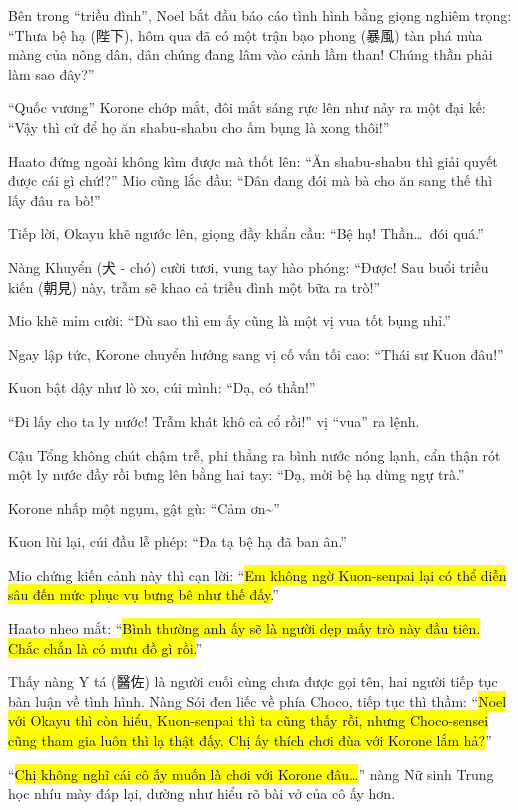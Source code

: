 \documentclass[../main.tex]{subfiles}
\begin{document}
Bên trong ``triều đình'', Noel bắt đầu báo cáo tình hình bằng giọng nghiêm trọng: ``Thưa bệ hạ (陛下), hôm qua đã có một trận bạo phong (暴風) tàn phá mùa màng của nông dân, dân chúng đang lâm vào cảnh lầm than! Chúng thần phải làm sao đây?''


``Quốc vương'' Korone chớp mắt, đôi mắt sáng rực lên như nảy ra một đại kế: ``Vậy thì cứ để họ ăn shabu-shabu cho ấm bụng là xong thôi!''

Haato đứng ngoài không kìm được mà thốt lên: ``Ăn shabu-shabu thì giải quyết được cái gì chứ!?'' Mio cũng lắc đầu: ``Dân đang đói mà bà cho ăn sang thế thì lấy đâu ra bò!''

Tiếp lời, Okayu khẽ ngước lên, giọng đầy khẩn cầu: ``Bệ hạ! Thần\dots\ đói quá.''

Nàng Khuyển (犬 - chó) cười tươi, vung tay hào phóng: ``Được! Sau buổi triều kiến (朝見) này, trẫm sẽ khao cả triều đình một bữa ra trò!''

Mio khẽ mỉm cười: ``Dù sao thì em ấy cũng là một vị vua tốt bụng nhỉ.''

Ngay lập tức, Korone chuyển hướng sang vị cố vấn tối cao: ``Thái sư Kuon đâu!''

Kuon bật dậy như lò xo, cúi mình: ``Dạ, có thần!''

``Đi lấy cho ta ly nước! Trẫm khát khô cả cổ rồi!'' vị ``vua'' ra lệnh.

Cậu Tổng không chút chậm trễ, phi thẳng ra bình nước nóng lạnh, cẩn thận rót một ly nước đầy rồi bưng lên bằng hai tay: ``Dạ, mời bệ hạ dùng ngự trà.''

Korone nhấp một ngụm, gật gù: ``Cảm ơn\~{}''

Kuon lùi lại, cúi đầu lễ phép: ``Đa tạ bệ hạ đã ban ân.''

Mio chứng kiến cảnh này thì cạn lời: ``\hl{Em không ngờ Kuon-senpai lại có thể diễn sâu đến mức phục vụ bưng bê như thế đấy.}''

Haato nheo mắt: ``\hl{Bình thường anh ấy sẽ là người dẹp mấy trò này đầu tiên. Chắc chắn là có mưu đồ gì rồi.}''


Thấy nàng Y tá (醫佐) là người cuối cùng chưa được gọi tên, hai người tiếp tục bàn luận về tình hình. Nàng Sói đen liếc về phía Choco, tiếp tục thì thầm: ``\hl{Noel với Okayu thì còn hiểu, Kuon-senpai thì ta cũng thấy rồi, nhưng Choco-sensei cũng tham gia luôn thì lạ thật đấy. Chị ấy thích chơi đùa với Korone lắm hả?}''

``{\hl{Chị không nghĩ cái cô ấy muốn là chơi với Korone đâu\dots}}'' nàng Nữ sinh Trung học nhíu mày đáp lại, dường như hiểu rõ bài vở của cô ấy hơn.
\end{document}
